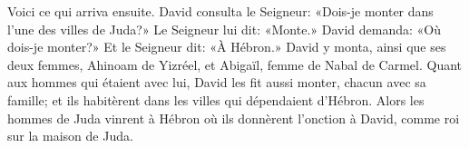 Voici ce qui arriva ensuite.
David consulta le Seigneur:
	«Dois-je monter dans l’une des villes de Juda?»
	Le Seigneur lui dit: «Monte.»
David demanda: «Où dois-je monter?»
	Et le Seigneur dit: «À Hébron.»
David y monta, ainsi que ses deux femmes,
	Ahinoam de Yizréel, et Abigaïl, femme de Nabal de Carmel.
Quant aux hommes qui étaient avec lui, David les fit aussi monter, chacun avec sa famille;
	et ils habitèrent dans les villes qui dépendaient d’Hébron.
Alors les hommes de Juda vinrent à Hébron
	où ils donnèrent l’onction à David, comme roi sur la maison de Juda.
